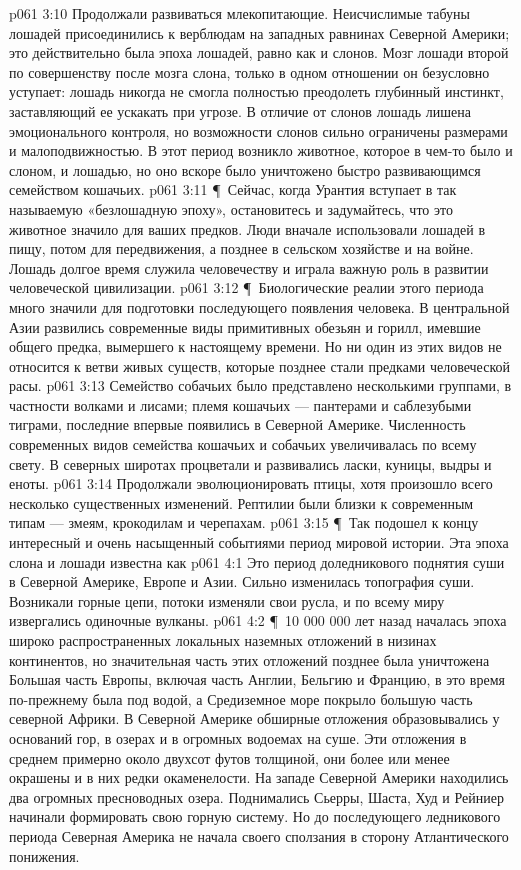 \vs p061 3:10 Продолжали развиваться млекопитающие. Неисчислимые табуны лошадей присоединились к верблюдам на западных равнинах Северной Америки; это действительно была эпоха лошадей, равно как и слонов. Мозг лошади второй по совершенству после мозга слона, только в одном отношении он безусловно уступает: лошадь никогда не смогла полностью преодолеть глубинный инстинкт, заставляющий ее ускакать при угрозе. В отличие от слонов лошадь лишена эмоционального контроля, но возможности слонов сильно ограничены размерами и малоподвижностью. В этот период возникло животное, которое в чем\hyp{}то было и слоном, и лошадью, но оно вскоре было уничтожено быстро развивающимся семейством кошачьих.
\vs p061 3:11 \P\ Сейчас, когда Урантия вступает в так называемую «безлошадную эпоху», остановитесь и задумайтесь, что это животное значило для ваших предков. Люди вначале использовали лошадей в пищу, потом для передвижения, а позднее в сельском хозяйстве и на войне. Лошадь долгое время служила человечеству и играла важную роль в развитии человеческой цивилизации.
\vs p061 3:12 \P\ Биологические реалии этого периода много значили для подготовки последующего появления человека. В центральной Азии развились современные виды примитивных обезьян и горилл, имевшие общего предка, вымершего к настоящему времени. Но ни один из этих видов не относится к ветви живых существ, которые позднее стали предками человеческой расы.
\vs p061 3:13 Семейство собачьих было представлено несколькими группами, в частности волками и лисами; племя кошачьих --- пантерами и саблезубыми тиграми, последние впервые появились в Северной Америке. Численность современных видов семейства кошачьих и собачьих увеличивалась по всему свету. В северных широтах процветали и развивались ласки, куницы, выдры и еноты.
\vs p061 3:14 Продолжали эволюционировать птицы, хотя произошло всего несколько существенных изменений. Рептилии были близки к современным типам --- змеям, крокодилам и черепахам.
\vs p061 3:15 \P\ Так подошел к концу интересный и очень насыщенный событиями период мировой истории. Эта эпоха слона и лошади известна как 
\vs p061 4:1 Это период доледникового поднятия суши в Северной Америке, Европе и Азии. Сильно изменилась топография суши. Возникали горные цепи, потоки изменяли свои русла, и по всему миру извергались одиночные вулканы.
\vs p061 4:2 \P\ 10 000 000 лет назад началась эпоха широко распространенных локальных наземных отложений в низинах континентов, но значительная часть этих отложений позднее была уничтожена Большая часть Европы, включая часть Англии, Бельгию и Францию, в это время по\hyp{}прежнему была под водой, а Средиземное море покрыло большую часть северной Африки. В Северной Америке обширные отложения образовывались у оснований гор, в озерах и в огромных водоемах на суше. Эти отложения в среднем примерно около двухсот футов толщиной, они более или менее окрашены и в них редки окаменелости. На западе Северной Америки находились два огромных пресноводных озера. Поднимались Сьерры, Шаста, Худ и Рейниер начинали формировать свою горную систему. Но до последующего ледникового периода Северная Америка не начала своего сползания в сторону Атлантического понижения.
